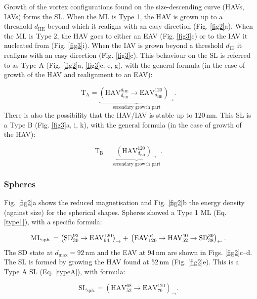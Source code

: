\documentclass[review,authoryear]{elsarticle}
\newcommand{\dmax}{d_\text{max}}
\newcommand{\nm}{\,\text{nm}}
\begin{document}
Growth of the vortex configurations found on the size-descending curve (HAVs, IAVs) forms the SL. When the ML is Type 1, the HAV is grown up to a threshold $d_\text{HE}$ beyond which it realigns with an easy direction (Fig. \ref{fig2}a). When the ML is Type 2, the HAV goes to either an EAV (Fig. \ref{fig3}c) or to the IAV it nucleated from (Fig. \ref{fig3}i). When the IAV is grown beyond a threshold $d_\text{IE}$ it realigns with an easy direction (Fig. \ref{fig3}c). This behaviour on the SL is referred to as Type A (Fig. \ref{fig2}a, \ref{fig3}c, e, g), with the general formula (in the case of growth of the HAV and realignment to an EAV):
{\par\nobreak\noindent}
\begin{equation}\label{typeA}
\text{T}_{\text{A}}=\underbrace{\left(\text{HAV}_{d_{\text{EH}}}^{d_{\text{HE}}}\rightarrow\text{EAV}_{d_{\text{HE}}}^{120}\right)_{\rightarrow}}_\text{secondary growth part}.
\end{equation}
There is also the possibility that the HAV/IAV is stable up to 120$\nm$. This SL is a Type B (Fig. \ref{fig3}a, i, k), with the general formula (in the case of growth of the HAV):
{\par\nobreak\noindent}
\begin{equation}\label{typeB}
\text{T}_{\text{B}}=\underbrace{\left(\text{HAV}_{d_{\text{EH}}}^{120}\right)_{\rightarrow}}_\text{secondary growth part}.
\end{equation}
\par

\subsubsection{Spheres}
Fig. \ref{fig2}a shows the reduced magnetisation and Fig. \ref{fig2}b the energy density (against size) for the spherical shapes. Spheres showed a Type 1 ML (Eq. \ref{type1}), with a specific formula:
{\par\nobreak\noindent}
\begin{equation}
\text{ML}_{\text{sph.}}=\left(\text{SD}_{30}^{92}\rightarrow\text{EAV}_{94}^{120}\right)_{\rightarrow} + \\
\left(\text{EAV}_{120}^{54}\rightarrow\text{HAV}_{52}^{40}\rightarrow\text{SD}_{38}^{30}\right)_{\leftarrow}.
\end{equation}
The SD state at $\dmax=92\,\text{nm}$ and the EAV at 94$\nm$ are shown in Figs. \ref{fig2}c--d. The SL is formed by growing the HAV found at 52$\nm$ (Fig. \ref{fig2}e). This is a Type A SL (Eq. \ref{typeA}), with formula:
{\par\nobreak\noindent}
\begin{equation}
\text{SL}_{\text{sph.}}=\left(\text{HAV}_{52}^{68}\rightarrow\text{EAV}_{70}^{120}\right)_{\rightarrow}.
\end{equation}
\par
\end{document}
